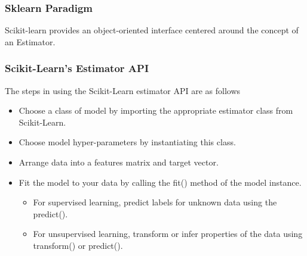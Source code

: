 %



\begin{frame}[fragile]\frametitle{Sklearn Paradigm}
Scikit-learn provides an object-oriented interface centered around the concept of an Estimator.

\end{frame}

\begin{frame}[fragile]\frametitle{Scikit-Learn's Estimator API}
The steps in using the Scikit-Learn estimator API are as follows
\begin{itemize}
\item Choose a class of model by importing the appropriate estimator class from Scikit-Learn.
\item Choose model hyper-parameters by instantiating this class.
\item Arrange data into a features matrix and target vector.
\item Fit the model to your data by calling the fit() method of the model instance.
\begin{itemize}
    \item For supervised learning, predict labels for unknown data using the predict().
    \item For unsupervised learning, transform or infer properties of the data using transform() or predict().
\end{itemize}
\end{itemize}
\end{frame}

